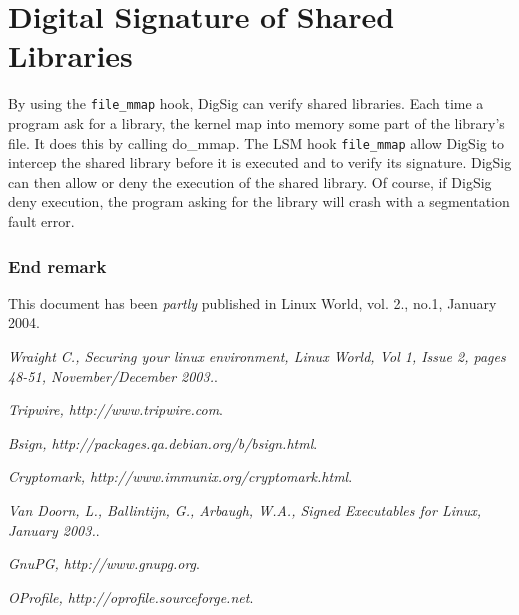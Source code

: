 \documentclass{article}
\begin{document}
\section{Digital Signature of Shared Libraries}

By using the {\tt file\_mmap} hook, DigSig can verify shared libraries.
Each time a program ask for a library, the kernel map into memory some
part of the library's file.  It does this by calling do\_mmap.  The LSM hook 
{\tt file\_mmap} allow DigSig to intercep the shared library before it is 
executed and to verify its signature. DigSig can then allow or deny the
execution of the shared library.  Of course, if DigSig deny execution, the
program asking for the library will crash with a segmentation fault error.

\subsubsection*{End remark}

{\small This document has been {\it partly} published in Linux World, vol. 2., no.1, January 2004.}

\begin{thebibliography}{99}

  {\em Wraight C., Securing your linux environment, Linux World, Vol 1, 
    Issue 2, pages 48-51, November/December 2003.}.

  {\em Tripwire, http://www.tripwire.com}.

  {\em Bsign, http://packages.qa.debian.org/b/bsign.html}. 

  {\em Cryptomark, http://www.immunix.org/cryptomark.html}.

  {\em Van Doorn, L., Ballintijn, G., Arbaugh, W.A., Signed Executables for Linux, January 2003.}.

  {\em GnuPG, http://www.gnupg.org}. 

  {\em OProfile, http://oprofile.sourceforge.net}. 


\end{thebibliography}
\end{document}
